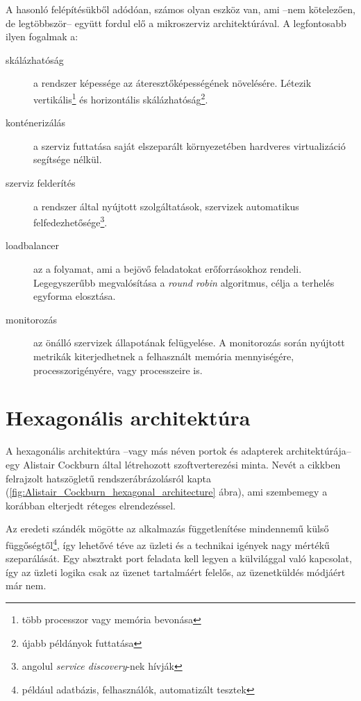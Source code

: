 A hasonló felépítésükből adódóan, számos olyan eszköz van, ami --nem kötelezően, de legtöbbször-- együtt fordul elő a mikroszerviz architektúrával. A legfontosabb ilyen fogalmak a:
\begin{description}
	\item[skálázhatóság] a rendszer képessége az áteresztőképességének növelésére.
	Létezik vertikális\footnote{több processzor vagy memória bevonása} és horizontális skálázhatóság\footnote{újabb példányok futtatása}.
	
	\item[konténerizálás] a szerviz futtatása saját elszeparált környezetében hardveres virtualizáció segítsége nélkül.	

	\item[szerviz felderítés] a rendszer által nyújtott szolgáltatások, szervizek automatikus
	felfedezhetősége\footnote{angolul \textit{service discovery}-nek hívják}.
	
	\item[loadbalancer] az a folyamat, ami a bejövő feladatokat erőforrásokhoz rendeli. Legegyszerűbb megvalósítása a \foreignlanguage{british}{\textit{round robin}} algoritmus, célja a terhelés egyforma elosztása.
	
	\item[monitorozás] az önálló szervizek állapotának felügyelése. A monitorozás során nyújtott metrikák kiterjedhetnek a felhasznált memória mennyiségére, processzorigényére, vagy processzeire is.
\end{description}


\section{Hexagonális architektúra}\label{sec:hexagonalis_architektura}
A hexagonális architektúra --vagy más néven portok és adapterek architektúrája-- egy \foreignlanguage{british}{Alistair Cockburn} által létrehozott \cite{Alistair_Cockburn} szoftverterezési minta. Nevét a cikkben felrajzolt hatszögletű rendszerábrázolásról kapta (\ref{fig:Alistair_Cockburn_hexagonal_architecture} ábra), ami szembemegy a korábban elterjedt réteges elrendezéssel.

Az eredeti szándék mögötte az alkalmazás függetlenítése mindennemű külső függőségtől\footnote{például adatbázis, felhasználók, automatizált tesztek}, így lehetővé téve az üzleti és a technikai igények nagy mértékű szeparálását.
Egy absztrakt port feladata kell legyen a külvilággal való kapcsolat, így az üzleti logika csak az üzenet tartalmáért felelős, az üzenetküldés módjáért már nem.

